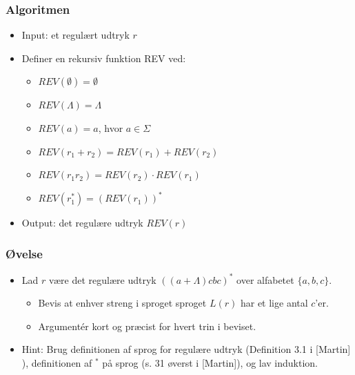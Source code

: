 \documentclass[]{beamer}
\begin{document}
\begin{frame}
\frametitle{Algoritmen}
\begin{itemize}[<+->]
\item Input: et regulært udtryk $r$
\item Definer en rekursiv funktion REV ved:
\begin{itemize}
\item $REV(∅) = ∅$
\item $REV(Λ) = Λ$
\item $REV(a) = a$,  hvor $a∈Σ$
\item $REV(r_1+r_2) = REV(r_1) + REV(r_2)$
\item $REV(r_1r_2) = REV(r_2)·REV(r_1)$
\item $REV(r_1^*) = (REV(r_1))^*$
\end{itemize}
\item Output: det regulære udtryk $REV(r)$
\end{itemize}
\end{frame}

\begin{frame}
\frametitle{Øvelse}
\begin{itemize}
\item Lad $r$ være det regulære udtryk $((a+Λ)cbc)^*$ over alfabetet
  $\{a,b,c\}$. 
\begin{itemize}
\item   Bevis at enhver streng i sproget sproget $L(r)$ har et
  lige antal $c$'er. 
\item   Argumentér kort og præcist for hvert trin i
  beviset.
\end{itemize}

\item Hint: Brug definitionen af sprog for regulære udtryk (Definition
  3.1 i [Martin] ), definitionen af ${}^*$ på sprog (s. 31 øverst i
  [Martin]), og lav induktion.
\end{itemize}
\end{frame}


 
\end{document}

